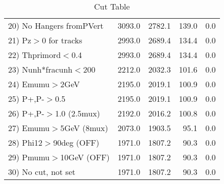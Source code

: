 \begin{table}[h!]
\begin{tabular}{||l||r|r|r|r||}
 20) No Hangers fromPVert &      3093.0 &      2782.1 &       139.0 &         0.0 \\
 21) Pz$>$0 for tracks    &      2993.0 &      2689.4 &       134.4 &         0.0 \\
 22) Thprimord$<$0.4      &      2993.0 &      2689.4 &       134.4 &         0.0 \\
 23) Nunh*fracunh$<$200   &      2212.0 &      2032.3 &       101.6 &         0.0 \\
 24) Emumu$>$2GeV         &      2195.0 &      2019.1 &       100.9 &         0.0 \\
 25) P+,P-$>$0.5          &      2195.0 &      2019.1 &       100.9 &         0.0 \\
 26) P+,P-$>$1.0 (2.5mux) &      2192.0 &      2016.2 &       100.8 &         0.0 \\
 27) Emumu$>$5GeV  (8mux) &      2073.0 &      1903.5 &        95.1 &         0.0 \\
 28) Phi12$>$90deg  (OFF) &      1971.0 &      1807.2 &        90.3 &         0.0 \\
 29) Pmumu$>$10GeV  (OFF) &      1971.0 &      1807.2 &        90.3 &         0.0 \\
 30) No cut, not set      &      1971.0 &      1807.2 &        90.3 &         0.0 \\
 \hline
 \hline
 \end{tabular}
 \caption{Cut Table \cohrp  }
 \label{tab-cut_crhop}
 \end{table}
